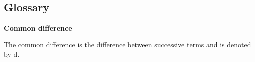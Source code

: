        \def\leftmark{GLOSSARY}
      \def\rightmark{GLOSSARY}
      \begin{indexheading}
     
\chapter{Glossary}
      \label{col11306*Glossary}
      \end{indexheading}
      \vspace{.3cm}
      
    \begin{description}\setlength{\topsep}{0cm}\setlength{\itemsep}{0cm}
    \setlength{\parskip}{0cm}\setlength{\parsep}{0cm}
    \setlength{\partopsep}{0cm}
    \setlength{\labelwidth}{.6cm}\setlength{\labelsep}{0cm}
    \setlength{\leftmargin}{1cm}

    
	    \vspace{.3cm}
	    \item[{\large \bfseries C}]\noindent\raggedright
	    {\bf Common difference}\\\begin{description}\item{\hspace{.3cm}}\hspace{.3cm}The common difference is the difference between successive terms and is denoted by d.\\\end{description}


\end{description}
